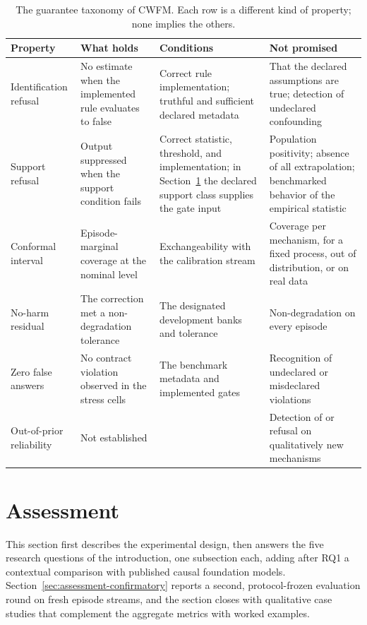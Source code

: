 \documentclass[electronics,article,submit,oneauthor]{Definitions/mdpi}
\begin{document}
\begin{table}[!t]
\caption{The guarantee taxonomy of CWFM. Each row is a different kind of property; none implies the others.\label{tab:guarantees}}
\footnotesize
\begin{tabularx}{\textwidth}{lXXX}
\toprule
\textbf{Property} & \textbf{What holds} & \textbf{Conditions} & \textbf{Not promised}\\
\midrule
Identification refusal & No estimate when the implemented rule evaluates to false & Correct rule implementation; truthful and sufficient declared metadata & That the declared assumptions are true; detection of undeclared confounding\\
Support refusal & Output suppressed when the support condition fails & Correct statistic, threshold, and implementation; in Section~\ref{sec:assessment} the declared support class supplies the gate input & Population positivity; absence of all extrapolation; benchmarked behavior of the empirical statistic\\
Conformal interval & Episode-marginal coverage at the nominal level & Exchangeability with the calibration stream & Coverage per mechanism, for a fixed process, out of distribution, or on real data\\
No-harm residual & The correction met a non-degradation tolerance & The designated development banks and tolerance & Non-degradation on every episode\\
Zero false answers & No contract violation observed in the stress cells & The benchmark metadata and implemented gates & Recognition of undeclared or misdeclared violations\\
Out-of-prior reliability & Not established & & Detection of or refusal on qualitatively new mechanisms\\
\bottomrule
\end{tabularx}
\end{table}

\section{Assessment}\label{sec:assessment}

This section first describes the experimental design, then answers the five research questions of the introduction, one subsection each, adding after RQ1 a contextual comparison with published causal foundation models. Section~\ref{sec:assessment-confirmatory} reports a second, protocol-frozen evaluation round on fresh episode streams, and the section closes with qualitative case studies that complement the aggregate metrics with worked examples.
\end{document}
